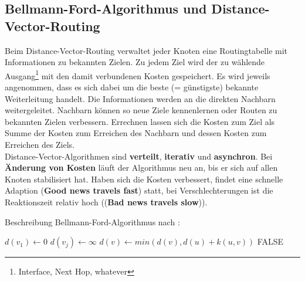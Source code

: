 \documentclass{article} %
\begin{document}
\subsection{Bellmann-Ford-Algorithmus und Distance-Vector-Routing}
Beim Distance-Vector-Routing verwaltet jeder Knoten eine Routingtabelle mit Informationen zu bekannten Zielen.
Zu jedem Ziel wird der zu wählende Ausgang\footnote{Interface, Next Hop, whatever} mit den damit verbundenen Kosten gespeichert.
Es wird jeweils angenommen, dass es sich dabei um die beste (= günstigste) bekannte  Weiterleitung handelt.
Die Informationen werden an die direkten Nachbarn weitergeleitet.
Nachbarn können so neue Ziele kennenlernen oder Routen zu bekannten Zielen verbessern.
Errechnen lassen sich die Kosten zum Ziel als Summe der Kosten zum Erreichen des Nachbarn und dessen Kosten zum Erreichen des Ziels.\\
Distance-Vector-Algorithmen sind \textbf{verteilt},  \textbf{iterativ} und \textbf{asynchron}.
Bei \textbf{Änderung von Kosten} läuft der Algorithmus neu an, bis er sich auf allen Knoten stabilisiert hat.
Haben sich die Kosten verbessert, findet eine schnelle Adaption (\textbf{Good news travels fast}) statt, bei Verschlechterungen ist die Reaktionszeit relativ hoch ((\textbf{Bad news travels slow})).

Beschreibung Bellmann-Ford-Algorithmus nach \cite{brandstadt1994graphen}:
\begin{algorithmic}
	\State $d(v_1) \gets 0$
	 $d(v_j) \gets \infty$ \EndFor	
			\State $d(v) \gets min(d(v),d(u) + k(u,v))$
		\EndFor
	\EndFor
		 \Return FALSE \EndIf
	\EndFor	
\end{algorithmic}

 
\end{document}
